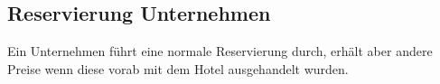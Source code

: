 \documentclass[../SubfileFeatures.tex]{subfiles}
\begin{document}
    \subsection{Reservierung Unternehmen}
	Ein Unternehmen führt eine normale Reservierung durch, erhält aber andere Preise wenn diese vorab mit dem Hotel ausgehandelt wurden.
\end{document}
